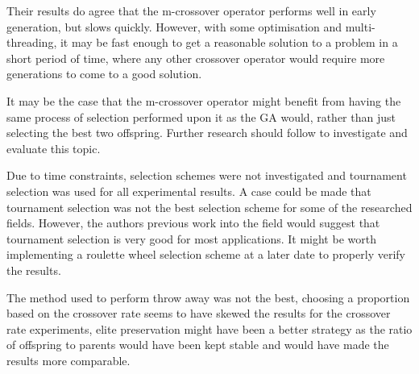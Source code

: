 \documentclass[10pt, a4paper]{article}
\begin{document}
Their results do agree that the m-crossover operator performs well in early 
generation, but slows quickly. However, with some optimisation and 
multi-threading, it may be fast enough to get a reasonable solution to a 
problem in a short period of time, where any other crossover operator would
require more generations to come to a good solution.

It may be the case that the m-crossover operator might benefit from having the
same process of selection performed upon it as the GA would, rather than just
selecting the best two offspring. Further research should follow to investigate
and evaluate this topic.

Due to time constraints, selection schemes were not investigated and tournament
selection was used for all experimental results. A case could be made that
tournament selection was not the best selection scheme for some of the
researched fields. However, the authors previous work into the field would 
suggest that tournament selection is very good for most applications. It might
be worth implementing a roulette wheel selection scheme at a later date to
properly verify the results.

The method used to perform throw away was not the best, choosing a proportion
based on the crossover rate seems to have skewed the results for the crossover
rate experiments, elite preservation might have been a better strategy as the
ratio of offspring to parents would have been kept stable and would have made
the results more comparable.



\end{document}
